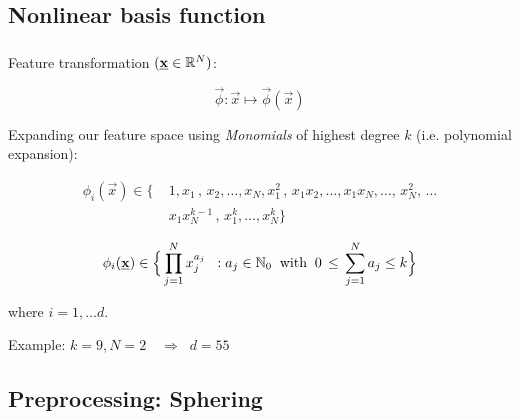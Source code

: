 \subsection{Nonlinear basis function}


\begin{frame}\frametitle{\subsecname}

Feature transformation $(\underline{\mathbf{x}}\in \mathbb{R}^N)$:

\begin{equation}
\vec \phi: \vec x \mapsto \vec \phi(\vec x)
\end{equation}

Expanding our feature space using \emph{Monomials} of highest degree $k$ (i.e. polynomial expansion):

\begin{align*}
\phi_i(\vec x) \in 
\{\;
&1, 
x_1\,,\, x_2, \ldots, x_N,
x_1^2\,,\, x_1 x_2, \ldots, x_1x_N,\ldots,\,x_N^2,\,\ldots\\
&x_1 x_N^{k-1}\,,\, x_1^k, \ldots, x_N^k
\}
\end{align*}

\begin{equation}
\phi_i(\underline{\mathbf{x}}) \in \Big\{ \prod_{j=1}^N x_j^{a_j} \;\;: a_j \in \mathbb{N}_0 \;\; \text{with} \;\; 0 \, \le \, \sum_{j=1}^{N} a_j \le k  
\Big\} 
\end{equation}

where $i=1,\ldots d$.

Example: $k=9, N=2 \quad \Rightarrow \;\; d=55$


\end{frame}

\subsection{Preprocessing: Sphering}


